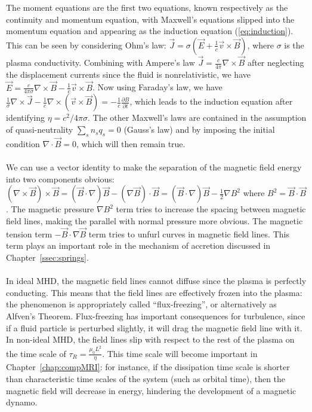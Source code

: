 The moment equations are the first two equations, known respectively as the continuity and momentum equation, with Maxwell's equations slipped into the momentum equation and appearing as the induction equation (\ref{eq:induction}). This can be seen by considering Ohm's law: $\vec J=\sigma(\vec E+\frac1c\vec v\times\vec B)$, where $\sigma$ is the plasma conductivity. Combining with Ampere's law $\vec J=\frac{c}{4\pi}\nabla\times\vec B$ after neglecting the displacement currents since the fluid is nonrelativistic, we have $\vec E=\frac{c}{4\pi\sigma}\nabla\times\vec B-\frac1c\vec v\times\vec B$. Now using Faraday's law, we have $\frac1\sigma\nabla\times\vec J-\frac1c\nabla\times(\vec v\times\vec B)=-\frac1c\frac{\partial B}{\partial t}$, which leads to the induction equation after identifying $\eta=c^2/4\pi\sigma$. The other Maxwell's laws are contained in the assumption of quasi-neutrality $\sum_s n_sq_s=0$ (Gauss's law) and by imposing the initial condition $\nabla\cdot\vec B=0$, which will then remain true. \\
\\
We can use a vector identity to make the separation of the magnetic field energy into two components obvious: $(\nabla\times\vec B)\times\vec B=(\vec B\cdot\nabla)\vec B-(\nabla\vec B)\cdot\vec B=(\vec B\cdot\nabla)\vec B-\frac12\nabla B^2$ where $B^2=\vec B\cdot\vec B$. The magnetic pressure $\nabla B^2$ term tries to increase the spacing between magnetic field lines, making the parallel with normal pressure more obvious. The magnetic tension term $-\vec B\cdot\nabla\vec B$ term tries to unfurl curves in magnetic field lines. This term plays an important role in the mechanism of accretion discussed in Chapter~\ref{ssec:springs}.\\
\\
In ideal MHD, the magnetic field lines cannot diffuse since the plasma is perfectly conducting. This means that the field lines are effectively frozen into the plasma: the phenomenon is appropriately called ``flux-freezing'', or alternatively as Alfven's Theorem. Flux-freezing has important consequences for turbulence, since if a fluid particle is perturbed slightly, it will drag the magnetic field line with it. In non-ideal MHD, the field lines slip with respect to the rest of the plasma on the time scale of $\tau_R=\frac{\mu_0L^2}{\eta}$. This time scale will become important in Chapter~\ref{chap:compMRI}: for instance, if the dissipation time scale is shorter than characteristic time scales of the system (such as orbital time), then the magnetic field will decrease in energy, hindering the development of a magnetic dynamo. \\
